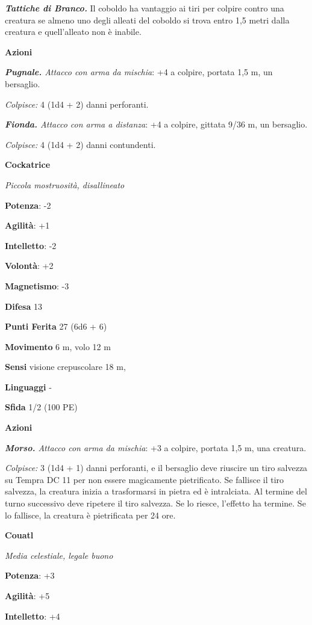 \begin{multicols}{2}
\emph{\textbf{Tattiche di Branco.}} Il coboldo ha vantaggio ai tiri per
colpire contro una creatura se almeno uno degli alleati del coboldo si
trova entro 1,5 metri dalla creatura e quell'alleato non è inabile.

\textbf{Azioni}

\emph{\textbf{Pugnale.} Attacco con arma da mischia}: +4 a colpire,
portata 1,5 m, un bersaglio.

\emph{Colpisce:} 4 (1d4 + 2) danni perforanti.

\emph{\textbf{Fionda.} Attacco con arma a distanza}: +4 a colpire,
gittata 9/36 m, un bersaglio.

\emph{Colpisce:} 4 (1d4 + 2) danni contundenti.

\textbf{Cockatrice}

\emph{Piccola mostruosità, disallineato}

\textbf{Potenza}: -2

\textbf{Agilità}: +1

\textbf{Intelletto}: -2

\textbf{Volontà}: +2

\textbf{Magnetismo}: -3

\textbf{Difesa} 13

\textbf{Punti Ferita} 27 (6d6 + 6)

\textbf{Movimento} 6 m, volo 12 m

\textbf{Sensi} visione crepuscolare 18 m, 

\textbf{Linguaggi} -

\textbf{Sfida} 1/2 (100 PE)

\textbf{Azioni}

\emph{\textbf{Morso.} Attacco con arma da mischia}: +3 a colpire,
portata 1,5 m, una creatura.

\emph{Colpisce:} 3 (1d4 + 1) danni perforanti, e il bersaglio deve
riuscire un tiro salvezza su Tempra DC 11 per non essere
magicamente pietrificato. Se fallisce il tiro salvezza, la creatura
inizia a trasformarsi in pietra ed è intralciata. Al termine del turno
successivo deve ripetere il tiro salvezza. Se lo riesce, l'effetto ha
termine. Se lo fallisce, la creatura è pietrificata per 24 ore.



\textbf{Couatl}

\emph{Media celestiale, legale buono}

\textbf{Potenza}: +3

\textbf{Agilità}: +5

\textbf{Intelletto}: +4


\end{multicols}

